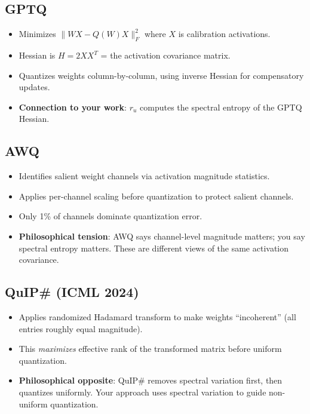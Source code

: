 \documentclass[11pt,a4paper]{article}
\begin{document}
\subsection{GPTQ \cite{frantar2022gptq}}
\begin{itemize}
    \item Minimizes $\|WX - Q(W)X\|_F^2$ where $X$ is calibration activations.
    \item Hessian is $H = 2XX^T$ = the activation covariance matrix.
    \item Quantizes weights column-by-column, using inverse Hessian for compensatory updates.
    \item \textbf{Connection to your work}: $r_u$ computes the spectral entropy of the GPTQ Hessian.
\end{itemize}

\subsection{AWQ \cite{lin2023awq}}
\begin{itemize}
    \item Identifies salient weight channels via activation magnitude statistics.
    \item Applies per-channel scaling before quantization to protect salient channels.
    \item Only 1\% of channels dominate quantization error.
    \item \textbf{Philosophical tension}: AWQ says channel-level magnitude matters; you say spectral entropy matters. These are different views of the same activation covariance.
\end{itemize}

\subsection{QuIP\# (ICML 2024)}
\begin{itemize}
    \item Applies randomized Hadamard transform to make weights ``incoherent'' (all entries roughly equal magnitude).
    \item This \emph{maximizes} effective rank of the transformed matrix before uniform quantization.
    \item \textbf{Philosophical opposite}: QuIP\# removes spectral variation first, then quantizes uniformly. Your approach uses spectral variation to guide non-uniform quantization.
\end{itemize}
\end{document}
